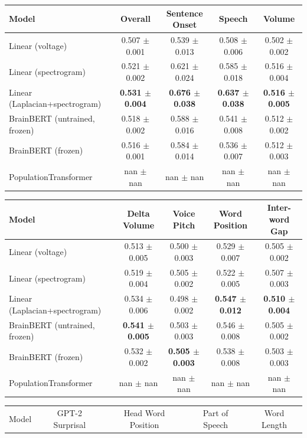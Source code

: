 \begin{table}[h]
\centering
\begin{tabular}{lcccc}
\hline
Model & Overall & Sentence Onset & Speech & Volume \\
\hline
Linear (voltage) & 0.507 $\pm$ 0.001 & 0.539 $\pm$ 0.013 & 0.508 $\pm$ 0.006 & 0.502 $\pm$ 0.002 \\
Linear (spectrogram) & 0.521 $\pm$ 0.002 & 0.621 $\pm$ 0.024 & 0.585 $\pm$ 0.018 & 0.516 $\pm$ 0.004 \\
Linear (Laplacian+spectrogram) & \textbf{0.531 $\pm$ 0.004} & \textbf{0.676 $\pm$ 0.038} & \textbf{0.637 $\pm$ 0.038} & \textbf{0.516 $\pm$ 0.005} \\
BrainBERT (untrained, frozen) & 0.518 $\pm$ 0.002 & 0.588 $\pm$ 0.016 & 0.541 $\pm$ 0.008 & 0.512 $\pm$ 0.002 \\
BrainBERT (frozen) & 0.516 $\pm$ 0.001 & 0.584 $\pm$ 0.014 & 0.536 $\pm$ 0.007 & 0.512 $\pm$ 0.003 \\
PopulationTransformer & nan $\pm$ nan & nan $\pm$ nan & nan $\pm$ nan & nan $\pm$ nan \\
\hline
\end{tabular}
\hspace{1em}
\begin{tabular}{lcccc}
\hline
Model & Delta Volume & Voice Pitch & Word Position & Inter-word Gap \\
\hline
Linear (voltage) & 0.513 $\pm$ 0.005 & 0.500 $\pm$ 0.003 & 0.529 $\pm$ 0.007 & 0.505 $\pm$ 0.002 \\
Linear (spectrogram) & 0.519 $\pm$ 0.004 & 0.505 $\pm$ 0.002 & 0.522 $\pm$ 0.005 & 0.507 $\pm$ 0.003 \\
Linear (Laplacian+spectrogram) & 0.534 $\pm$ 0.006 & 0.498 $\pm$ 0.002 & \textbf{0.547 $\pm$ 0.012} & \textbf{0.510 $\pm$ 0.004} \\
BrainBERT (untrained, frozen) & \textbf{0.541 $\pm$ 0.005} & 0.503 $\pm$ 0.003 & 0.546 $\pm$ 0.008 & 0.505 $\pm$ 0.002 \\
BrainBERT (frozen) & 0.532 $\pm$ 0.002 & \textbf{0.505 $\pm$ 0.003} & 0.538 $\pm$ 0.008 & 0.503 $\pm$ 0.003 \\
PopulationTransformer & nan $\pm$ nan & nan $\pm$ nan & nan $\pm$ nan & nan $\pm$ nan \\
\hline
\end{tabular}
\hspace{1em}
\begin{tabular}{lcccc}
\hline
Model & GPT-2 Surprisal & Head Word Position & Part of Speech & Word Length \\

\end{tabular}
\end{table}
